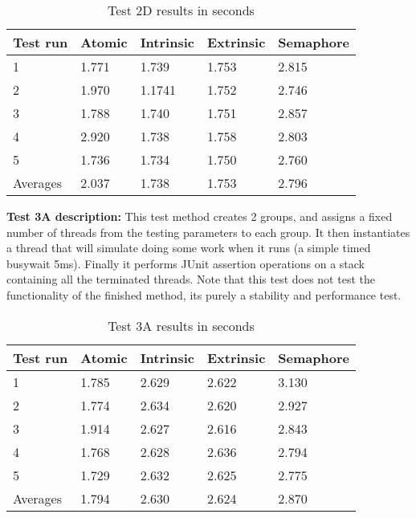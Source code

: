 \documentclass[11pt]{article}
\begin{document}
\begin{table}[H]
\centering
\caption{Test 2D results in seconds}
\label{tab:my-table}
\begin{tabular}{|l|l|l|l|l|}
\hline
Test run & Atomic & Intrinsic & Extrinsic & Semaphore \\ \hline
1        & 1.771  & 1.739     & 1.753     & 2.815     \\ \hline
2        & 1.970  & 1.1741     & 1.752     & 2.746     \\ \hline
3        & 1.788  & 1.740     & 1.751     & 2.857     \\ \hline
4        & 2.920  & 1.738     & 1.758     & 2.803     \\ \hline
5        & 1.736  & 1.734     & 1.750     & 2.760     \\ \hline
Averages & 2.037  & 1.738     & 1.753     & 2.796     \\ \hline
\end{tabular}
\end{table}


\textbf{Test 3A description:} This test method creates 2 groups, and assigns a fixed number of threads from the testing parameters to each group. It then instantiates a thread that will simulate doing some work when it runs (a simple timed busywait 5ms). Finally it performs JUnit assertion operations on a stack containing all the terminated threads. Note that this test does not test the functionality of the finished method, its purely a stability and performance test.\\ 

\begin{table}[H]
\centering
\caption{Test 3A results in seconds}
\label{tab:my-table}
\begin{tabular}{|l|l|l|l|l|}
\hline
Test run & Atomic & Intrinsic & Extrinsic & Semaphore \\ \hline
1        & 1.785  & 2.629     & 2.622     & 3.130     \\ \hline
2        & 1.774  & 2.634     & 2.620     & 2.927     \\ \hline
3        & 1.914  & 2.627     & 2.616     & 2.843     \\ \hline
4        & 1.768  & 2.628     & 2.636     & 2.794     \\ \hline
5        & 1.729  & 2.632     & 2.625     & 2.775     \\ \hline
Averages & 1.794  & 2.630     & 2.624     & 2.870     \\ \hline
\end{tabular}
\end{table}
\end{document}

